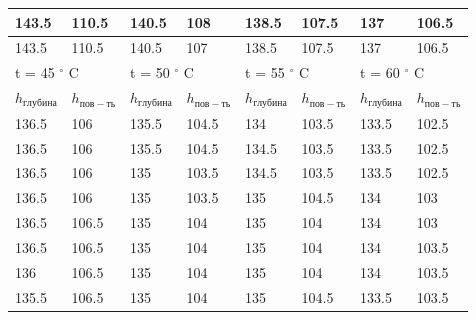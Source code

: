 \documentclass[a4paper,12pt]{article} %
\begin{document}
\begin{table}[h!]
\begin{tabular}{|ll|ll|ll|ll|}
\multicolumn{1}{|l|}{143.5}         & 110.5        & \multicolumn{1}{l|}{140.5}         & 108          & \multicolumn{1}{l|}{138.5}         & 107.5        & \multicolumn{1}{l|}{137}           & 106.5        \\ \hline
\multicolumn{1}{|l|}{143.5}         & 110.5        & \multicolumn{1}{l|}{140.5}         & 107          & \multicolumn{1}{l|}{138.5}         & 107.5        & \multicolumn{1}{l|}{137}           & 106.5        \\ \hline \hline
\multicolumn{2}{|l|}{t = 45 $^\circ$ C}            & \multicolumn{2}{l|}{t = 50 $^\circ$ C}            & \multicolumn{2}{l|}{t = 55 $^\circ$ C}            & \multicolumn{2}{l|}{t = 60 $^\circ$ C}            \\ \hline
\multicolumn{1}{|l|}{$h_{глубина}$} & $h_{пов-ть}$ & \multicolumn{1}{l|}{$h_{глубина}$} & $h_{пов-ть}$ & \multicolumn{1}{l|}{$h_{глубина}$} & $h_{пов-ть}$ & \multicolumn{1}{l|}{$h_{глубина}$} & $h_{пов-ть}$ \\ \hline
\multicolumn{1}{|l|}{136.5}         & 106          & \multicolumn{1}{l|}{135.5}         & 104.5        & \multicolumn{1}{l|}{134}           & 103.5        & \multicolumn{1}{l|}{133.5}         & 102.5        \\ \hline
\multicolumn{1}{|l|}{136.5}         & 106          & \multicolumn{1}{l|}{135.5}         & 104.5        & \multicolumn{1}{l|}{134.5}         & 103.5        & \multicolumn{1}{l|}{133.5}         & 102.5        \\ \hline
\multicolumn{1}{|l|}{136.5}         & 106          & \multicolumn{1}{l|}{135}           & 103.5        & \multicolumn{1}{l|}{134.5}         & 103.5        & \multicolumn{1}{l|}{133.5}         & 102.5        \\ \hline
\multicolumn{1}{|l|}{136.5}         & 106          & \multicolumn{1}{l|}{135}           & 103.5        & \multicolumn{1}{l|}{135}           & 104.5        & \multicolumn{1}{l|}{134}           & 103          \\ \hline
\multicolumn{1}{|l|}{136.5}         & 106.5        & \multicolumn{1}{l|}{135}           & 104          & \multicolumn{1}{l|}{135}           & 104          & \multicolumn{1}{l|}{134}           & 103          \\ \hline
\multicolumn{1}{|l|}{136.5}         & 106.5        & \multicolumn{1}{l|}{135}           & 104          & \multicolumn{1}{l|}{135}           & 104          & \multicolumn{1}{l|}{134}           & 103.5        \\ \hline
\multicolumn{1}{|l|}{136}           & 106.5        & \multicolumn{1}{l|}{135}           & 104          & \multicolumn{1}{l|}{135}           & 104          & \multicolumn{1}{l|}{134}           & 103.5        \\ \hline
\multicolumn{1}{|l|}{135.5}         & 106.5        & \multicolumn{1}{l|}{135}           & 104          & \multicolumn{1}{l|}{135}           & 104.5        & \multicolumn{1}{l|}{133.5}         & 103.5        \\ \hline
\end{tabular}
\end{table}
\end{document}
